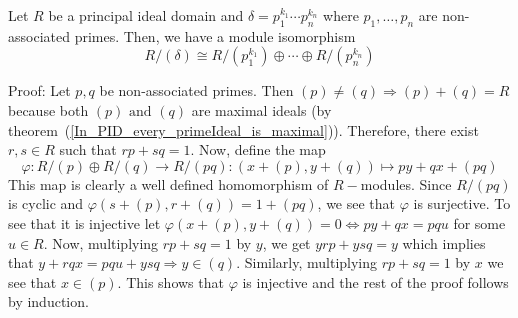 \begin{dang}
    \begin{lemma}\label{Za x Zb is isomorphic to Zab}\cite{curtis1966representation}
        Let $R$ be a principal ideal domain and $\delta=p_1^{k_1}\cdots p_n^{k_n}$ where $p_1,\dots,p_n$ are non-associated primes. Then, we have a module isomorphism
        \begin{equation}
            R/(\delta)\cong R/(p_1^{k_1})\oplus\cdots\oplus R/(p_n^{k_n})
        \end{equation}
    \end{lemma}
\end{dang}
Proof: Let $p,q$ be non-associated primes. Then $(p)\neq(q)\Rightarrow (p)+(q)=R$ because both $(p) \text{ and }(q)$ are maximal ideals (by theorem~(\ref{In_PID_every_primeIdeal_is_maximal})). Therefore, there exist $r,s\in R$ such that $rp+sq=1$. Now, define the map
\begin{equation}
    \varphi: R/(p)\oplus R/(q)\rightarrow R/(pq):(x+(p),y+(q))\mapsto py+qx+(pq)
\end{equation}
This map is clearly a well defined homomorphism of $R-$modules. Since $R/(pq)$ is cyclic and $\varphi(s+(p),r+(q))=1+(pq)$, we see that $\varphi$ is surjective. To see that it is injective let $\varphi(x+(p),y+(q))=0\iff py+qx=pqu$ for some $u\in R$. Now, multiplying $rp+sq=1$ by $y$, we get $yrp+ysq=y$ which implies that $y+rqx=pqu+ysq\Rightarrow y\in (q)$. Similarly, multiplying $rp+sq=1$ by $x$ we see that $x\in (p)$. 
This shows that $\varphi$ is injective and the rest of the proof follows by induction.

